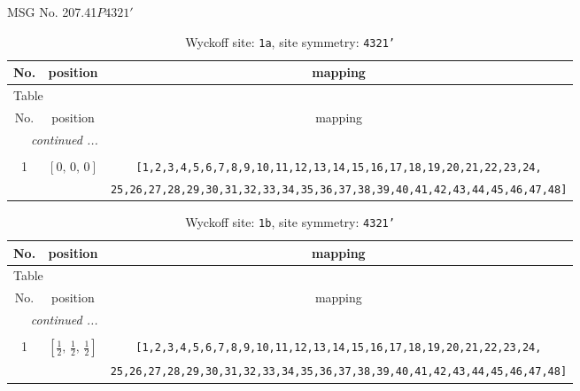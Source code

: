 \documentclass[fleqn,8pt]{jsarticle}
\begin{document}
\setcounter{MaxMatrixCols}{32}

\renewcommand{\tablename}{Table~}
\renewcommand{\figurename}{Figure~}
\begin{center}
\LARGE
MSG No. 207.41\quad$P4321'$
\end{center}
\renewcommand{\arraystretch}{1.2}
\begin{longtable}{ccc}
\caption{Wyckoff site: {\tt 1a}, site symmetry: {\tt 4321'}}
 \\
 \hline \hline
No. & position & mapping \\ \hline \endfirsthead

\multicolumn{2}{l}{\tablename\ \thetable{}} \\
 \hline \hline
No. & position & mapping \\ \hline \endhead

 \hline \hline
\multicolumn{2}{r}{\footnotesize\it continued ...} \\ \endfoot

 \hline \hline
\multicolumn{2}{r}{} \\ \endlastfoot

1 & $\left[ 0,\, 0,\, 0 \right]$ & {\tt [1,2,3,4,5,6,7,8,9,10,11,12,13,14,15,16,17,18,19,20,21,22,23,24,} \\ \hline
 &  & {\tt 25,26,27,28,29,30,31,32,33,34,35,36,37,38,39,40,41,42,43,44,45,46,47,48]} \\
\end{longtable}
\renewcommand{\arraystretch}{1.2}
\begin{longtable}{ccc}
\caption{Wyckoff site: {\tt 1b}, site symmetry: {\tt 4321'}}
 \\
 \hline \hline
No. & position & mapping \\ \hline \endfirsthead

\multicolumn{2}{l}{\tablename\ \thetable{}} \\
 \hline \hline
No. & position & mapping \\ \hline \endhead

 \hline \hline
\multicolumn{2}{r}{\footnotesize\it continued ...} \\ \endfoot

 \hline \hline
\multicolumn{2}{r}{} \\ \endlastfoot

1 & $\left[ \frac{1}{2},\, \frac{1}{2},\, \frac{1}{2} \right]$ & {\tt [1,2,3,4,5,6,7,8,9,10,11,12,13,14,15,16,17,18,19,20,21,22,23,24,} \\ \hline
 &  & {\tt 25,26,27,28,29,30,31,32,33,34,35,36,37,38,39,40,41,42,43,44,45,46,47,48]} \\
\end{longtable}
\end{document}
